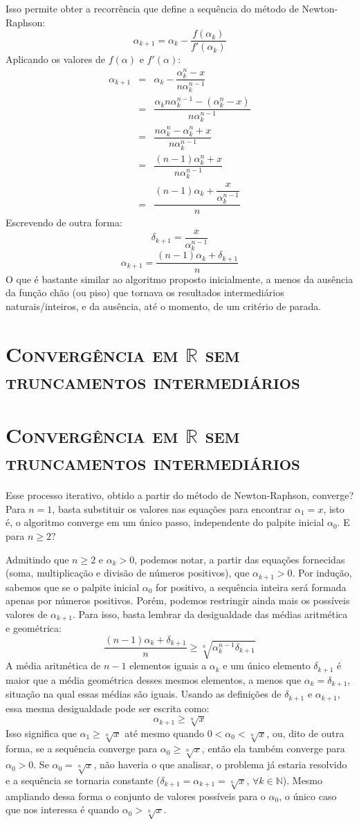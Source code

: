 \documentclass{article}
\let \sectionBkp = \section
\newcommand{\sectionFormatter}[1]{
    \centering\large\textbf{\textsc{#1}}}
\renewcommand{\section}[2]
    {\ifthenelse{\equal{#1}{*}}
        {\sectionBkp*{\sectionFormatter{#2}}}
        {\sectionBkp{\sectionFormatter{#2}}}
    }
\begin{document}
Isso permite obter a recorrência
que define a sequência do método de Newton-Raphson:
\[\alpha_{k+1} = \alpha_k - \dfrac{f(\alpha_k)}{f'(\alpha_k)}\]
Aplicando os valores de $f(\alpha)$ e $f'(\alpha)$:
\[
  \begin{array}{rcl}
  \alpha_{k+1}
  &=& \alpha_k - \dfrac{\alpha_k^n - x}{n \alpha_k^{n-1}} \\[5mm]
  &=& \dfrac{\alpha_k n \alpha_k^{n-1}
    - (\alpha_k^n - x)}{n \alpha_k^{n-1}} \\[5mm]
  &=& \dfrac{n \alpha_k^n - \alpha_k^n + x}{n \alpha_k^{n-1}} \\[5mm]
  &=& \dfrac{(n-1) \alpha_k^n + x}{n \alpha_k^{n-1}} \\[5mm]
  &=& \dfrac{(n-1) \alpha_k + \dfrac{x}{\alpha_k^{n-1}}}{n}
  \end{array}
\]
Escrevendo de outra forma:
\[\delta_{k+1} = \dfrac{x}{\alpha_k^{n-1}}\]
\[\alpha_{k+1} = \dfrac{(n-1) \alpha_k + \delta_{k+1}}{n}\]
O que é bastante similar ao algoritmo proposto inicialmente,
a menos da ausência da função chão (ou piso)
que tornava os resultados intermediários naturais/inteiros,
e da ausência, até o momento, de um critério de parada.


\section*{Convergência em $\mathds{R}$ sem truncamentos intermediários}

Esse processo iterativo,
obtido a partir do método de Newton-Raphson,
converge?
Para $n = 1$, basta substituir os valores nas equações
para encontrar $\alpha_1 = x$,
isto é, o algoritmo converge em um único passo,
independente do palpite inicial $\alpha_0$.
E para $n \ge 2$?

Admitindo que $n \ge 2$ e $\alpha_k > 0$,
podemos notar, a partir das equações fornecidas
(soma, multiplicação e divisão de números positivos),
que $\alpha_{k+1} > 0$.
Por indução, sabemos que se o palpite inicial $\alpha_0$ for positivo,
a sequência inteira será formada apenas por números positivos.
Porém, podemos restringir ainda mais
os possíveis valores de $\alpha_{k+1}$.
Para isso,
basta lembrar da desigualdade das médias aritmética e geométrica:
\[
  \dfrac{(n-1) \alpha_k + \delta_{k+1}}{n} \ge
  \sqrt[n]{\alpha_k^{n-1} \delta_{k+1}}
\]
A média aritmética de $n-1$ elementos iguais a $\alpha_k$
e um único elemento $\delta_{k+1}$
é maior que a média geométrica desses mesmos elementos,
a menos que $\alpha_k = \delta_{k+1}$,
situação na qual essas médias são iguais.
Usando as definições de $\delta_{k+1}$ e $\alpha_{k+1}$,
essa mesma desigualdade pode ser escrita como:
\[\alpha_{k+1} \ge \sqrt[n]{x}\]
Isso significa que $\alpha_1 \ge \sqrt[n]{x}$
até mesmo quando $0 < \alpha_0 < \sqrt[n]{x}$,
ou, dito de outra forma,
se a sequência converge para $\alpha_0 \ge \sqrt[n]{x}$,
então ela também converge para $\alpha_0 > 0$.
Se $\alpha_0 = \sqrt[n]{x}$, não haveria o que analisar,
o problema já estaria resolvido
e a sequência se tornaria constante
($\delta_{k+1} = \alpha_{k+1} = \sqrt[n]{x}$,
 $\forall k \in \mathds{N}$).
Mesmo ampliando dessa forma
o conjunto de valores possíveis para o $\alpha_0$,
o único caso que nos interessa é quando $\alpha_0 > \sqrt[n]{x}$.
\end{document}
